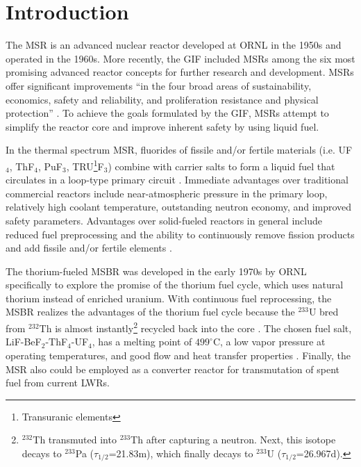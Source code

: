 \section{Introduction}
The \gls{MSR} is an advanced nuclear reactor developed at \gls{ORNL} 
in the 1950s and operated in the 1960s. More recently, the \gls{GIF}  
included \glspl{MSR} among the six most promising advanced reactor concepts for 
further research and development. 
\glspl{MSR} offer significant improvements ``in the four broad areas of 
sustainability, economics, safety and reliability, and proliferation resistance 
and physical protection'' \cite{doe_technology_2002}. To achieve the goals 
formulated by the GIF, \glspl{MSR} attempt to simplify the reactor core and 
improve inherent safety by using liquid fuel.

In the thermal spectrum \gls{MSR}, fluorides of fissile and/or fertile 
materials (i.e. UF$_4$, ThF$_4$,  PuF$_3$, TRU\footnote{ Transuranic 
elements}F$_3$) combine with carrier salts to form a liquid fuel that 
circulates in a loop-type primary circuit \cite{haubenreich_experience_1970}. 
Immediate advantages over traditional commercial reactors include 
near-atmospheric pressure in the primary loop, 
relatively high coolant temperature, outstanding neutron economy, and improved 
safety parameters. Advantages over solid-fueled reactors in general include 
reduced fuel preprocessing and the ability to continuously remove fission 
products and add fissile and/or fertile elements 
\cite{leblanc_molten_2010}. 

The thorium-fueled \gls{MSBR} was developed in the 
early 1970s by \gls{ORNL} specifically to explore the promise of the thorium 
fuel cycle, which uses natural thorium instead of enriched uranium. With 
continuous fuel reprocessing, the \gls{MSBR} realizes the advantages of the 
thorium fuel cycle because the $^{233}$U bred from 
$^{232}$Th is almost instantly\footnote{\space $^{232}$Th transmuted into 
$^{233}$Th after capturing a neutron. Next, this isotope decays to $^{233}$Pa 
($\tau_{1/2}$=21.83m), which finally decays to $^{233}$U 
($\tau_{1/2}$=26.967d).} recycled back into the core 
\cite{betzler_modeling_2016}. The chosen fuel salt, LiF-BeF$_2$-ThF$_4$-UF$_4$, has a 
melting point of $499^\circ$C, a low vapor pressure at operating temperatures, 
and good flow and heat transfer properties \cite{robertson_conceptual_1971}.  
Finally, the \gls{MSR} also could be employed as a converter reactor for 
transmutation of spent fuel from current \glspl{LWR}.

